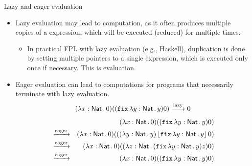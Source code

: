 \documentclass[paper=screen,mode=present,style=zysimple]{powerdot}
\begin{document}
\begin{slide}{Lazy and eager evaluation}
\begin{itemize}
\item Lazy evaluation may lead to  computation, as it often produces multiple copies of 
  a expression, which will be executed (reduced) for multiple times. 
\vspace*{-0.5em}
\begin{itemize}
\item In practical FPL with lazy evaluation (e.g., Haskell), duplication is done by setting multiple
  pointers to a single expression, which is executed only once if necessary.
  This is   evaluation.
\vspace*{-1em}
\end{itemize}
\item Eager evaluation can lead to  computations for programs that necessarily terminate with 
  lazy evaluation.
\vspace*{-0.5em}
\[
(\lambda x : \tnat \ldot 0) ((\cfix \lambda y : \tnat \ldot y) 0)
\lazyreduce 0
\vspace*{-1em}
\]
\begin{eqnarray*}
& & (\lambda x : \mathsf{Nat} \, . \, 0) ((\mathtt{fix}\, \lambda y : \mathsf{Nat} \, . \, y) 0)
\\ & \xrightarrow{\mathrm{eager}} &
(\lambda x : \mathsf{Nat} \, . \, 0) (((\lambda y: \mathsf{Nat} \, . \, y) \left\lfloor{\mathtt{fix}\,\lambda y: \mathsf{Nat}\, . \, y}\right\rfloor 0)
\\ & \xrightarrow{\mathrm{eager}} &
(\lambda x : \mathsf{Nat} \, . \, 0) ((\lambda z: \mathsf{Nat} \, . \, (\mathtt{fix}\, \lambda y: \mathsf{Nat} \, . \, y) z) 0)
\\ & \xrightarrow{\mathrm{eager}} &
(\lambda x : \mathsf{Nat} \, . \, 0) ((\mathtt{fix}\, \lambda y: \mathsf{Nat} \, . \, y) 0)
\end{eqnarray*}
\end{itemize}
\end{slide}
\end{document}
